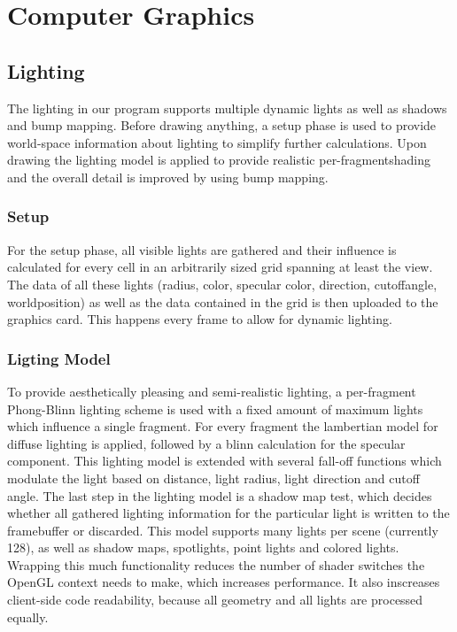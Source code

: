 \chapter{Computer Graphics}

\section{Lighting}
The lighting in our program supports multiple dynamic lights as well as shadows and bump mapping.  Before drawing anything, a setup phase is used to provide world-space information about lighting to simplify further calculations. Upon drawing the lighting model is applied to provide realistic per-fragmentshading and the overall detail is improved by using bump mapping.

\subsection{Setup}
For the setup phase, all visible lights are gathered and their influence is calculated for every cell in an arbitrarily sized grid spanning at least the view. The data of all these lights (radius, color, specular color, direction, cutoffangle, worldposition) as well as the data contained in the grid is then uploaded to the graphics card. This happens every frame to allow for dynamic lighting.  

\subsection{Ligting Model}
To provide aesthetically pleasing and semi-realistic lighting, a per-fragment Phong-Blinn lighting scheme is used with a fixed amount of maximum lights which influence a single fragment. For every fragment the lambertian model for diffuse lighting is applied, followed by a blinn calculation for the specular component. This lighting model is extended with several fall-off functions which modulate the light based on distance, light radius, light direction and cutoff angle. The last step in the lighting model is a shadow map test, which decides whether all gathered lighting information for the particular light is written to the framebuffer or discarded. This model supports many lights per scene (currently 128), as well as shadow maps, spotlights, point lights and colored lights. Wrapping this much functionality reduces the number of shader switches the OpenGL context needs to make, which increases performance. It also inscreases client-side code readability, because all geometry and all lights are processed 
equally.

